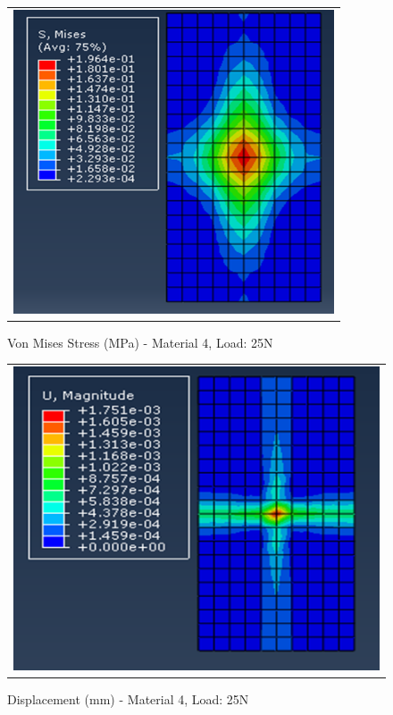 \documentclass[a4paper,12pt]{article}
\numberwithin{equation}{section}
\numberwithin{figure}{section}
\begin{document}
\begin{figure}[H]
  \centering
  \begin{tabular}{@{}c@{}}
    \includegraphics[width=0.7\linewidth,height=255pt]{Results/Point Loading/M4_VMS_L5.png} \\
  \end{tabular}
  \caption{Von Mises Stress (MPa) - Material 4, Load: 25N}
\end{figure}

\begin{figure}[H]
  \centering
  \begin{tabular}{@{}c@{}}
    \includegraphics[width=0.7\linewidth,height=255pt]{Results/Point Loading/M4_DIS_L5.png} \\
  \end{tabular}
  \caption{Displacement (mm) - Material 4, Load: 25N}
\end{figure}
\end{document}
